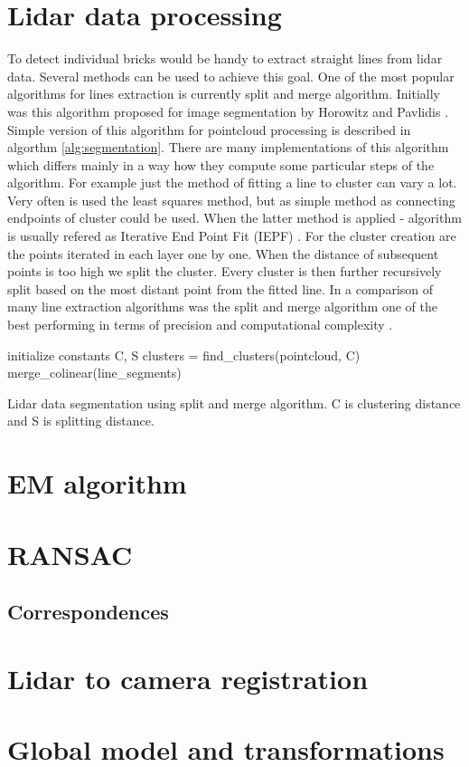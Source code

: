 \section{Lidar data processing}

To detect individual bricks would be handy to extract straight lines from lidar data. Several methods can be used to achieve this goal. One of the most popular algorithms for lines extraction is currently split and merge algorithm. Initially was this algorithm proposed for image segmentation by Horowitz and Pavlidis \cite{horowitz1974}. Simple version of this algorithm for pointcloud processing is described in algorthm \ref{alg:segmentation}. There are many implementations of this algorithm which differs mainly in a way how they compute some particular steps of the algorithm. For example just the method of fitting a line to cluster can vary a lot. Very often is used the least squares method, but as simple method as connecting endpoints of cluster could be used. When the latter method is applied - algorithm is usually refered as Iterative End Point Fit (IEPF) \cite{siadat1997}. For the cluster creation are the points iterated in each layer one by one. When the distance of subsequent points is too high we split the cluster. Every cluster is then further recursively split based on the most distant point from the fitted line. In a comparison of many line extraction algorithms was the split and merge algorithm one of the best performing in terms of precision and computational complexity \cite{nguyen2006}.
\begin{algorithm}[]
initialize constants C, S\;
  clusters = find\_clusters(pointcloud, C)\;
merge\_colinear(line\_segments)\;
 
 \caption{Lidar data segmentation using split and merge algorithm. C is clustering distance and S is splitting distance.}
 \label{alg:segmentation}
\end{algorithm}


\section{EM algorithm}

\section{RANSAC}

\subsection{Correspondences}

\section{Lidar to camera registration}

\section{Global model and transformations}